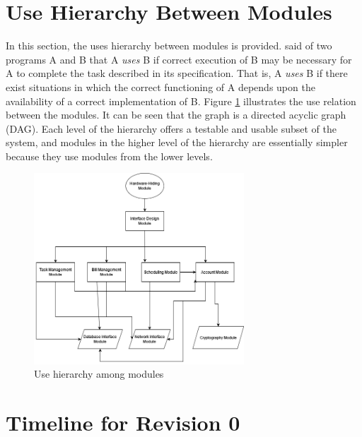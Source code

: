 \documentclass[12pt, titlepage]{article}
\begin{document}
\section{Use Hierarchy Between Modules} \label{SecUse}

In this section, the uses hierarchy between modules is
provided. \citet{Parnas1978} said of two programs A and B that A {\em uses} B if correct execution of B may be necessary for A to complete the task described in its specification. That is, A {\em uses} B if there exist situations in which the correct functioning of A depends upon the availability of a correct implementation of B.  Figure \ref{FigUH} illustrates the use relation between the modules. It can be seen that the graph is a directed acyclic graph (DAG). Each level of the hierarchy offers a testable and usable subset of the system, and modules in the higher level of the hierarchy are essentially simpler
because they use modules from the lower levels.

\begin{figure}[H]
\centering
\includegraphics[width=0.7\textwidth]{UsesHierarchy.png}
\caption{Use hierarchy among modules}
\label{FigUH}
\end{figure}


\section{Timeline for Revision 0} \label{Timeline}
\end{document}
